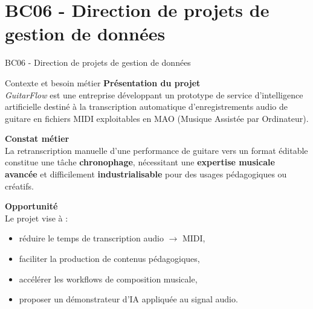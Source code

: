 \section{BC06 - Direction de projets de gestion de données}

\begin{frame}
    \centering
    \huge
    BC06 - Direction de projets de gestion de données
\end{frame}

\begin{frame}{Contexte et besoin métier}
	\textbf{Présentation du projet}\\
	\textit{GuitarFlow} est une entreprise développant un prototype de service d’intelligence artificielle destiné à la transcription automatique d’enregistrements audio de guitare en fichiers MIDI exploitables en MAO (Musique Assistée par Ordinateur).
	
	\vspace{0.3cm}
	
	\textbf{Constat métier}\\
	La retranscription manuelle d’une performance de guitare vers un format éditable constitue une tâche \textbf{chronophage}, nécessitant une \textbf{expertise musicale avancée} et difficilement \textbf{industrialisable} pour des usages pédagogiques ou créatifs.
	
	\vspace{0.3cm}
	
	\textbf{Opportunité}\\
	Le projet vise à :
	\begin{itemize}
		\item réduire le temps de transcription audio $\rightarrow$ MIDI,
		\item faciliter la production de contenus pédagogiques,
		\item accélérer les workflows de composition musicale,
		\item proposer un démonstrateur d’IA appliquée au signal audio.
	\end{itemize}
\end{frame}

